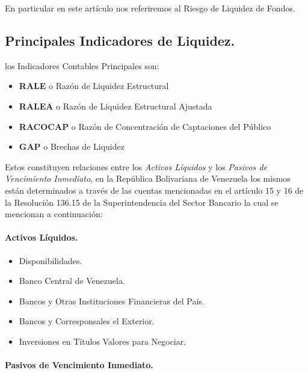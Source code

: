 \documentclass[]{article}
\providecommand{\tightlist}{%
  \setlength{\itemsep}{0pt}\setlength{\parskip}{0pt}}
\begin{document}
En particular en este artículo nos referiremos al Riesgo de Liquidez de
Fondos.

\hypertarget{principales-indicadores-de-liquidez.}{%
\subsection{\texorpdfstring{\textbf{Principales Indicadores de
Liquidez.}}{Principales Indicadores de Liquidez.}}\label{principales-indicadores-de-liquidez.}}

los Indicadores Contables Principales son:

\begin{itemize}
\tightlist
\item
  \textbf{RALE} o Razón de Liquidez Estructural
\item
  \textbf{RALEA} o Razón de Liquidez Estructural Ajustada\\
\item
  \textbf{RACOCAP} o Razón de Concentración de Captaciones del Público
\item
  \textbf{GAP} o Brechas de Liquidez
\end{itemize}

Estos constituyen relaciones entre los \emph{Activos Líquidos} y los
\emph{Pasivos de Vencimiento Inmediato}, en la República Bolivariana de
Venezuela los mismos están determinados a través de las cuentas
mencionadas en el artículo 15 y 16 de la Resolución 136.15 de la
Superintendencia del Sector Bancario la cual se mencionan a
continuación:

\hypertarget{activos-liquidos.}{%
\paragraph{Activos Líquidos.}\label{activos-liquidos.}}

\begin{itemize}
\tightlist
\item
  Disponibilidades.\\
\item
  Banco Central de Venezuela.\\
\item
  Bancos y Otras Instituciones Financieras del País.
\item
  Bancos y Corresponsales el Exterior.
\item
  Inversiones en Títulos Valores para Negociar.
\end{itemize}

\hypertarget{pasivos-de-vencimiento-inmediato.}{%
\paragraph{Pasivos de Vencimiento
Inmediato.}\label{pasivos-de-vencimiento-inmediato.}}
\end{document}
